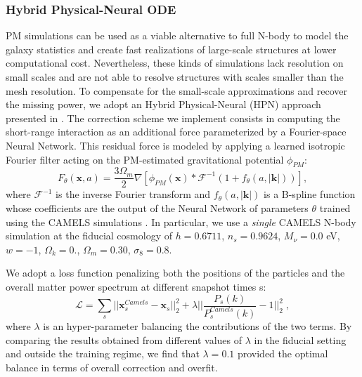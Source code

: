 \documentclass{aa}
\begin{document}
\subsubsection{ Hybrid Physical-Neural ODE}\label{N_body_des}    
PM simulations can be used as a viable alternative to full N-body to model the galaxy statistics and create fast realizations of large-scale structures at lower computational cost. Nevertheless, these kinds of simulations lack resolution on small scales and are not able to resolve structures with scales smaller than the mesh resolution.
To compensate for
the small-scale approximations and recover the missing power, we adopt an Hybrid Physical-Neural (HPN) approach presented in \citet{lanzieri2022hybrid}. 
The correction scheme we implement consists in computing the short-range interaction as an additional force parameterized by a Fourier-space Neural Network.
This residual force is modeled by applying a learned isotropic Fourier filter acting
on the PM-estimated gravitational potential $\phi_{PM}$:
\begin{equation}\label{hybrid_model}
    F_\theta(\mathbf{x}, a) = \frac{3 \Omega_m}{2}  \nabla \left[ \phi_{PM} (\mathbf{x}) \ast \mathcal{F}^{-1}(1 + f_\theta(a,|\mathbf{k}|)) \right],
\end{equation}
where $\mathcal{F}^{-1}$ is the inverse Fourier transform and $f_\theta(a,|\mathbf{k}|)$ is a B-spline function whose coefficients are the output of the Neural Network of parameters $\theta$ trained using the CAMELS simulations \citep{villaescusa2021camels}. In particular,  we use a \textit{single} CAMELS N-body simulation at the fiducial cosmology of $h=0.6711$, $n_s =0.9624$, $M_{\nu} = 0.0$ eV, $w=-1$, $\Omega_k = 0.$, $\Omega_m=0.30$, $\sigma_8= 0.8$. 


We adopt a loss function penalizing both the positions
of the particles and the overall matter power spectrum at
different snapshot times s:
\begin{equation}\label{loss2}
    \mathcal{L} =  \sum_{s} || \mathbf{x}^{Camels}_s - \mathbf{x}_s ||_2^2  + \lambda || \frac{P_s(k)}{P_s^{Camels}(k)} -1 ||_2^2 \; ,
\end{equation}
where $\lambda$ is an hyper-parameter balancing the
contributions of the two terms. By comparing the results obtained from different values of $\lambda$ in the fiducial setting and outside the training regime, we find that $\lambda= 0.1$ provided the optimal balance in terms of overall correction and overfit. 
\end{document}

